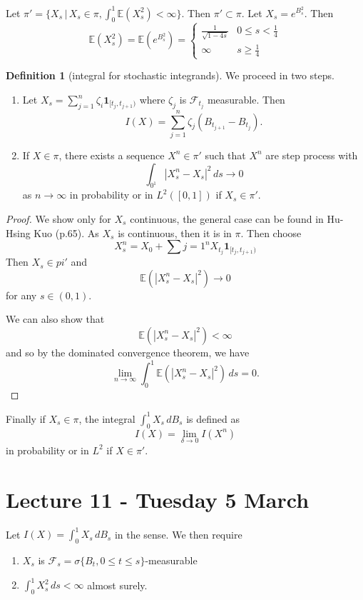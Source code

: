 \documentclass[10pt, oneside, reqno]{amsart}
\theoremstyle{plain}%
\theoremstyle{definition}
\newtheorem{defn}[thm]{Definition}
\theoremstyle{remark}
\newcommand{\E}{\mathbb{E}}
\newcommand{\sigf}{\mathcal{F}}
\begin{document}
Let $\pi' = \{ X_s \, | \, X_s \in \pi, \int_0^1 \E(X_s^2) < \infty \}$.  Then $\pi' \subset \pi$.  Let $X_s = e^{B_s^2}$.  Then \[
    \E(X_s^2) = \E(e^{B_s^2}) = \begin{cases}
        \frac{1}{\sqrt{1-4s}} & 0 \leq s < \frac{1}{4} \\
        \infty & s \geq \frac{1}{4}
    \end{cases}
\]  

\begin{defn}[\ito integral for stochastic integrands]
    We proceed in two steps.  
    \begin{enumerate}
        \item Let $X_s = \sum_{j=1}^n \zeta_i \mathbf{1}_{[t_j, t_{j+1})}$ where $\zeta_j$ is $\sigf_{t_j}$ measurable.  Then \[
            I(X) = \sum_{j=1}^n \zeta_j (B_{t_{j+1}} - B_{t_j}).
        \]
        \item If $X \in \pi$, there exists a sequence $X^n \in \pi'$ such that $X^n$ are step process with \[
            \int_{0^1} | X^n_s - X_s |^2 \, ds \rightarrow 0
        \] as $n \rightarrow \infty$ in probability or in $L^2([0,1])$ if $X_s \in \pi'$.  
    \end{enumerate}
    \begin{proof}
        We show only for $X_s$ continuous, the general case can be found in Hu-Hsing Kuo (p.65).  As $X_s$ is continuous, then it is in $\pi$.  Then choose \[
            X^n_s = X_0 + \sum{j=1}^n X_{t_j} \mathbf{1}_{[t_j, t_{j+1})}
        \]  Then $X_s \in pi'$ and \[
            \E(|X^n_s - X_s|^2) \rightarrow 0
        \] for any $s \in (0,1)$.
        
        We can also show that \[
            \E(|X^n_s - X_s|^2) < \infty
        \] and so by the dominated convergence theorem, we have \[
            \lim_{n \rightarrow \infty} \int_0^1 \E(|X^n_s - X_s|^2) \, ds = 0.
        \]
    \end{proof}
    \item Finally if $X_s \in \pi$, the \ito integral $\int_0^1 X_s \, dB_s$ is defined as \[
        I(X) = \lim_{\delta \rightarrow 0} I(X^n)
    \] in probability or in $L^2$ if $X \in \pi'$.  
\end{defn}

\section{Lecture 11 - Tuesday 5 March} %
\label{sec:lecture_11_tuesday_5_march}
Let $I(X) = \int_0^1 X_s \, dB_s$ in the \ito sense.  We then require
\begin{enumerate}
    \item $X_s$ is $\sigf_s = \sigma \{ B_t, 0 \leq t \leq s \}$-measurable
    \item $\int_0^1 X_s^2 \, ds < \infty$ almost surely.  
\end{enumerate}
\end{document}
